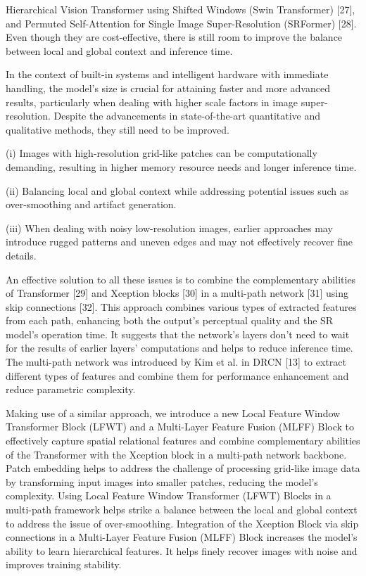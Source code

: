 \documentclass[twocolumn]{svjour3}          %
\begin{document}
Hierarchical Vision Transformer using Shifted Windows (Swin Transformer) [27], and Permuted Self-Attention for Single Image Super-Resolution (SRFormer) [28]. Even though they are cost-effective, there is still room to improve the balance between local and global context and inference time.

In the context of built-in systems and intelligent hardware with immediate handling, the model's size is crucial for attaining faster and more advanced results, particularly when dealing with higher scale factors in image super-resolution. Despite the advancements in state-of-the-art quantitative and qualitative methods, they still need to be improved.

(i) Images with high-resolution grid-like patches can be computationally demanding, resulting in higher memory resource needs and longer inference time. 

(ii) Balancing local and global context while addressing potential issues such as over-smoothing and artifact generation. 

(iii) When dealing with noisy low-resolution images, earlier approaches may introduce rugged patterns and uneven edges and may not effectively recover fine details.

An effective solution to all these issues is to combine the complementary abilities of Transformer [29] and Xception blocks [30] in a multi-path network [31] using skip connections [32]. This approach combines various types of extracted features from each path, enhancing both the output's perceptual quality and the SR model's operation time. It suggests that the network's layers don't need to wait for the results of earlier layers' computations and helps to reduce inference time. The multi-path network was introduced by Kim et al. in DRCN [13] to extract different types of features and combine them for performance enhancement and reduce parametric complexity. 

Making use of a similar approach, we introduce a new Local Feature Window Transformer Block (LFWT) and a Multi-Layer Feature Fusion (MLFF) Block to effectively capture spatial relational features and combine complementary abilities of the Transformer with the Xception block in a multi-path network backbone. Patch embedding helps to address the challenge of processing grid-like image data by transforming input images into smaller patches, reducing the model's complexity. Using Local Feature Window Transformer (LFWT) Blocks in a multi-path framework helps strike a balance between the local and global context to address the issue of over-smoothing.  Integration of the Xception Block via skip connections in a Multi-Layer Feature Fusion (MLFF) Block increases the model’s ability to learn hierarchical features. It helps finely recover images with noise and improves training stability.
\end{document}
